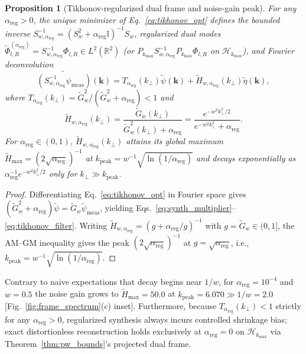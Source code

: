 \documentclass[aps,pra,onecolumn,notitlepage,11pt,tightenlines,amsmath,amssymb,floatfix,longbibliography]{revtex4-2}
\newtheorem{proposition}{Proposition}
\begin{document}
\begin{proposition}[Tikhonov-regularized dual frame and noise-gain peak]
\label{prop:tikhonov_dual}
For any $\alpha_{\mathrm{reg}} > 0$, the unique minimizer of Eq.~\eqref{eq:tikhonov_opt} defines the bounded inverse $S_{w,\alpha_{\mathrm{reg}}}^{-1} = (S_w^2 + \alpha_{\mathrm{reg}}\mathbb{I})^{-1}S_w$, regularized dual modes $\widetilde{\Phi}_{l,R}^{(\alpha_{\mathrm{reg}})} = S_{w,\alpha_{\mathrm{reg}}}^{-1}\Phi_{l,R} \in L^2(\mathbb{R}^2)$ (or $P_{k_{\max}}S_{w,\alpha_{\mathrm{reg}}}^{-1}P_{k_{\max}}\Phi_{l,R}$ on $\mathcal{H}_{k_{\max}}$), and Fourier deconvolution
\begin{equation}
\widetilde{(S_{w,\alpha_{\mathrm{reg}}}^{-1}\psi_{\mathrm{meas}})}(\mathbf{k}) = T_{\alpha_{\mathrm{reg}}}(k_\perp)\widetilde{\psi}(\mathbf{k}) + \widetilde{H}_{w,\alpha_{\mathrm{reg}}}(k_\perp)\widetilde{\eta}(\mathbf{k}),
\label{eq:synth_multiplier}
\end{equation}
where $T_{\alpha_{\mathrm{reg}}}(k_\perp) = \widetilde{G}_w^2/(\widetilde{G}_w^2 + \alpha_{\mathrm{reg}}) < 1$ and
\begin{equation}
\widetilde{H}_{w,\alpha_{\mathrm{reg}}}(k_\perp) = \frac{\widetilde{G}_w(k_\perp)}{\widetilde{G}_w^2(k_\perp) + \alpha_{\mathrm{reg}}} = \frac{e^{-w^2 k_\perp^2/2}}{e^{-w^2 k_\perp^2} + \alpha_{\mathrm{reg}}}.
\label{eq:tikhonov_filter}
\end{equation}
For $\alpha_{\mathrm{reg}} \in (0,1)$, $\widetilde{H}_{w,\alpha_{\mathrm{reg}}}(k_\perp)$ attains its global maximum $\widetilde{H}_{\max} = (2\sqrt{\alpha_{\mathrm{reg}}})^{-1}$ at $k_{\mathrm{peak}} = w^{-1}\sqrt{\ln(1/\alpha_{\mathrm{reg}})}$ and decays exponentially as $\alpha_{\mathrm{reg}}^{-1}e^{-w^2 k_\perp^2/2}$ only for $k_\perp \gg k_{\mathrm{peak}}$.
\end{proposition}
\begin{proof}
Differentiating Eq.~\eqref{eq:tikhonov_opt} in Fourier space gives $(\widetilde{G}_w^2 + \alpha_{\mathrm{reg}})\widetilde{\psi} = \widetilde{G}_w\widetilde{\psi}_{\mathrm{meas}}$, yielding Eqs.~\eqref{eq:synth_multiplier}--\eqref{eq:tikhonov_filter}. Writing $\widetilde{H}_{w,\alpha_{\mathrm{reg}}} = (g + \alpha_{\mathrm{reg}}/g)^{-1}$ with $g = \widetilde{G}_w \in (0,1]$, the AM--GM inequality gives the peak $(2\sqrt{\alpha_{\mathrm{reg}}})^{-1}$ at $g = \sqrt{\alpha_{\mathrm{reg}}}$, i.e., $k_{\mathrm{peak}} = w^{-1}\sqrt{\ln(1/\alpha_{\mathrm{reg}})}$.
\end{proof}

Contrary to naive expectations that decay begins near $1/w$, for $\alpha_{\mathrm{reg}} = 10^{-4}$ and $w = 0.5$ the noise gain grows to $\widetilde{H}_{\max} = 50.0$ at $k_{\mathrm{peak}} = 6.070 \gg 1/w = 2.0$ [Fig.~\ref{fig:frame_spectrum}(c) inset]. Furthermore, because $T_{\alpha_{\mathrm{reg}}}(k_\perp) < 1$ strictly for any $\alpha_{\mathrm{reg}} > 0$, regularized synthesis always incurs controlled shrinkage bias; exact distortionless reconstruction holds exclusively at $\alpha_{\mathrm{reg}} = 0$ on $\mathcal{H}_{k_{\max}}$ via Theorem~\ref{thm:pw_bounds}'s projected dual frame.
\end{document}
